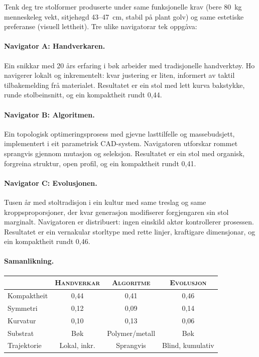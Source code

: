 Tenk deg tre stolformer produserte under same funksjonelle krav
(bere 80~kg menneskeleg vekt, sitjehøgd 43--47~cm, stabil på
plant golv) og same estetiske preferanse (visuell lettheit). Tre
ulike navigatorar tek oppgåva:

\paragraph{Navigator A: Handverkaren.}
Ein snikkar med 20 års erfaring i bøk arbeider med tradisjonelle
handverktøy. Ho navigerer lokalt og inkrementelt: kvar justering
er liten, informert av taktil tilbakemelding frå materialet.
Resultatet er ein stol med lett kurva bakstykke, runde
stolbeinsnitt, og ein kompaktheit rundt 0{,}44.

\paragraph{Navigator B: Algoritmen.}
Ein topologisk optimeringsprosess med gjevne lasttilfelle og
massebudsjett, implementert i eit parametrisk CAD-system.
Navigatoren utforskar rommet sprangvis gjennom mutasjon og
seleksjon. Resultatet er ein stol med organisk, forgreina
struktur, open profil, og ein kompaktheit rundt 0{,}41.

\paragraph{Navigator C: Evolusjonen.}
Tusen år med stoltradisjon i ein kultur med same treslag og same
kroppsproporsjoner, der kvar generasjon modifiserer forgjengaren
sin stol marginalt. Navigatoren er distribuert: ingen einskild
aktør kontrollerer prosessen. Resultatet er ein vernakular
storltype med rette linjer, kraftigare dimensjonar, og ein
kompaktheit rundt 0{,}46.

\paragraph{Samanlikning.}
\begin{center}
\begin{tabular}{@{}lccc@{}}
\toprule
& \textsc{Handverkar} & \textsc{Algoritme} & \textsc{Evolusjon} \\
\midrule
Kompaktheit & 0{,}44 & 0{,}41 & 0{,}46 \\
Symmetri & 0{,}12 & 0{,}09 & 0{,}14 \\
Kurvatur & 0{,}10 & 0{,}13 & 0{,}06 \\
\midrule
Substrat & Bøk & Polymer/metall & Bøk \\
Trajektorie & Lokal, inkr. & Sprangvis & Blind, kumulativ \\
\bottomrule
\end{tabular}
\end{center}


